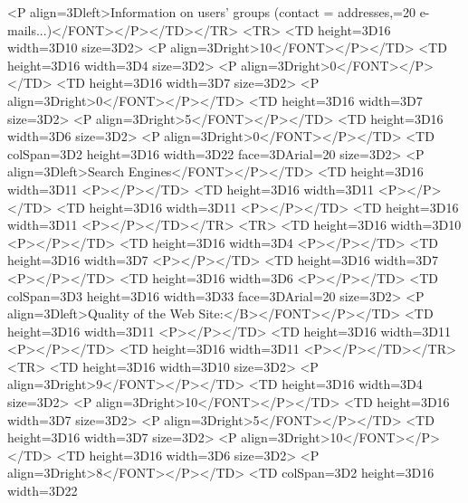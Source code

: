             <P align=3Dleft>Information on users' groups (contact =
addresses,=20
            e-mails...)</FONT></P></TD></TR>
    <TR>
        <TD height=3D16 width=3D10%
size=3D2>
            <P align=3Dright>10</FONT></P></TD>
        <TD height=3D16 width=3D4%
size=3D2>
            <P align=3Dright>0</FONT></P></TD>
        <TD height=3D16 width=3D7%
size=3D2>
            <P align=3Dright>0</FONT></P></TD>
        <TD height=3D16 width=3D7%
size=3D2>
            <P align=3Dright>5</FONT></P></TD>
        <TD height=3D16 width=3D6%
size=3D2>
            <P align=3Dright>0</FONT></P></TD>
        <TD colSpan=3D2 height=3D16 width=3D22%
face=3DArial=20
            size=3D2>
            <P align=3Dleft>Search Engines</FONT></P></TD>
        <TD height=3D16 width=3D11%
            <P></P></TD>
        <TD height=3D16 width=3D11%
            <P></P></TD>
        <TD height=3D16 width=3D11%
            <P></P></TD>
        <TD height=3D16 width=3D11%
            <P></P></TD></TR>
    <TR>
        <TD height=3D16 width=3D10%
            <P></P></TD>
        <TD height=3D16 width=3D4%
            <P></P></TD>
        <TD height=3D16 width=3D7%
            <P></P></TD>
        <TD height=3D16 width=3D7%
            <P></P></TD>
        <TD height=3D16 width=3D6%
            <P></P></TD>
        <TD colSpan=3D3 height=3D16 width=3D33%
face=3DArial=20
            size=3D2>
            <P align=3Dleft>Quality of the Web Site:</B></FONT></P></TD>
        <TD height=3D16 width=3D11%
            <P></P></TD>
        <TD height=3D16 width=3D11%
            <P></P></TD>
        <TD height=3D16 width=3D11%
            <P></P></TD></TR>
    <TR>
        <TD height=3D16 width=3D10%
size=3D2>
            <P align=3Dright>9</FONT></P></TD>
        <TD height=3D16 width=3D4%
size=3D2>
            <P align=3Dright>10</FONT></P></TD>
        <TD height=3D16 width=3D7%
size=3D2>
            <P align=3Dright>5</FONT></P></TD>
        <TD height=3D16 width=3D7%
size=3D2>
            <P align=3Dright>10</FONT></P></TD>
        <TD height=3D16 width=3D6%
size=3D2>
            <P align=3Dright>8</FONT></P></TD>
        <TD colSpan=3D2 height=3D16 width=3D22%
